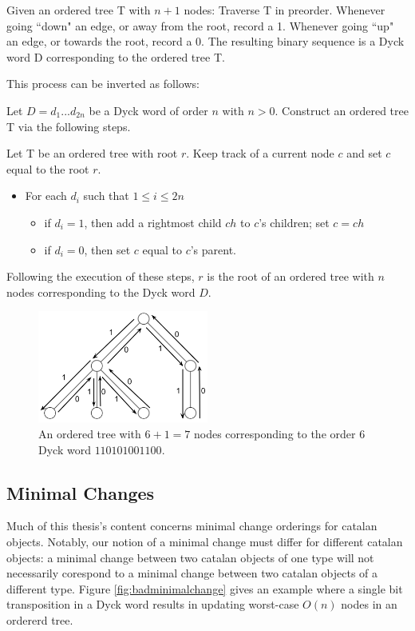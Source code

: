 Given an ordered tree T with $n+1$ nodes: Traverse T in preorder.  Whenever going ``down" an edge, or away from the root, record a 1.  Whenever going ``up" an edge, or towards the root, record a 0.  The resulting binary sequence is a Dyck word D corresponding to the ordered tree T. 

This process can be inverted as follows: 

Let $D=d_1...d_{2n}$ be a Dyck word of order $n$ with $n > 0$. Construct an ordered tree T via the following steps. 

Let T be an ordered tree with root $r$.  Keep track of a current node $c$ and set $c$ equal to the root $r$.

\begin{itemize}
    \item For each $d_i$ such that $1 \le i \le 2n$ 
	\begin{itemize}
	    \item if $d_i=1$, then add a rightmost child $ch$ to $c$'s children; set $c=ch$
	    \item if $d_i=0$, then set $c$ equal to $c$'s parent.
	\end{itemize}

\end{itemize}

Following the execution of these steps, $r$ is the root of an ordered tree with $n$ nodes corresponding to the Dyck word $D$.

\begin{figure}
    \centering
    \includegraphics[width=0.5\textwidth]{otreebij.png}
    \caption{An ordered tree with $6+1=7$ nodes corresponding to the order 6 Dyck word $110101001100$.}
    \label{ordered_tree_bijection_illustration}
\end{figure}

\subsection{Minimal Changes}
Much of this thesis's content concerns minimal change orderings for catalan objects.  Notably, our notion of a minimal change must differ for different catalan objects: a minimal change between two catalan objects of one type will not necessarily corespond to a minimal change between two catalan objects of a different type.  Figure \ref{fig:badminimalchange} gives an example where a single bit transposition in a Dyck word results in updating worst-case $O(n)$ nodes in an ordererd tree.


